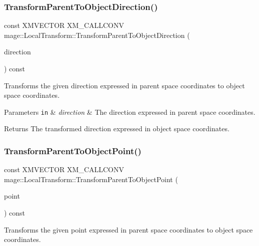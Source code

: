 \subsubsection{\texorpdfstring{Transform\+Parent\+To\+Object\+Direction()}{TransformParentToObjectDirection()}}
{\footnotesize\ttfamily const X\+M\+V\+E\+C\+T\+OR X\+M\+\_\+\+C\+A\+L\+L\+C\+O\+NV mage\+::\+Local\+Transform\+::\+Transform\+Parent\+To\+Object\+Direction (\begin{DoxyParamCaption}\item[{F\+X\+M\+V\+E\+C\+T\+OR}]{direction }\end{DoxyParamCaption}) const\hspace{0.3cm}{\ttfamily [noexcept]}}

Transforms the given direction expressed in parent space coordinates to object space coordinates.


\begin{DoxyParams}[1]{Parameters}
\mbox{\tt in}  & {\em direction} & The direction expressed in parent space coordinates. \\
\hline
\end{DoxyParams}
\begin{DoxyReturn}{Returns}
The transformed direction expressed in object space coordinates. 
\end{DoxyReturn}
\hypertarget{classmage_1_1_local_transform_a869e0acb9947f74405bad09164182373}{}\label{classmage_1_1_local_transform_a869e0acb9947f74405bad09164182373} 
\subsubsection{\texorpdfstring{Transform\+Parent\+To\+Object\+Point()}{TransformParentToObjectPoint()}}
{\footnotesize\ttfamily const X\+M\+V\+E\+C\+T\+OR X\+M\+\_\+\+C\+A\+L\+L\+C\+O\+NV mage\+::\+Local\+Transform\+::\+Transform\+Parent\+To\+Object\+Point (\begin{DoxyParamCaption}\item[{F\+X\+M\+V\+E\+C\+T\+OR}]{point }\end{DoxyParamCaption}) const\hspace{0.3cm}{\ttfamily [noexcept]}}

Transforms the given point expressed in parent space coordinates to object space coordinates.


